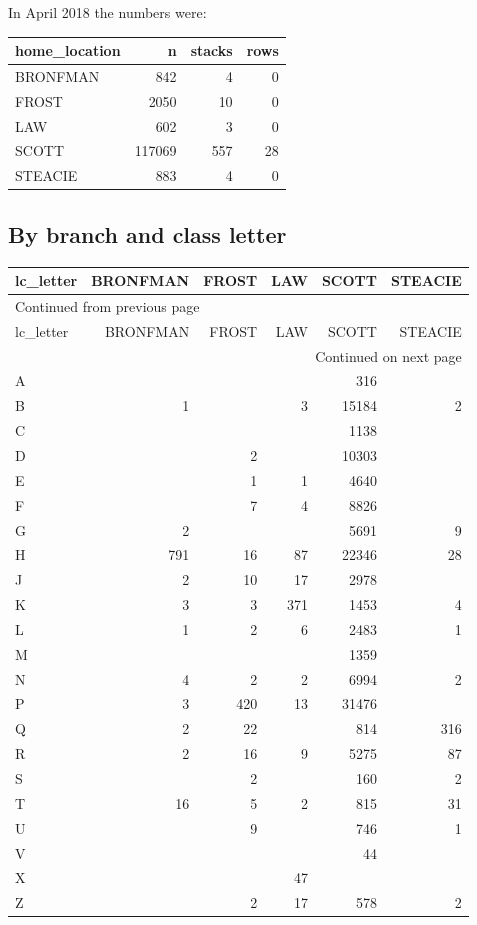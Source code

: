 \documentclass[11pt]{article}
\begin{document}
In April 2018 the numbers were:

\begin{center}
\begin{tabular}{lrrr}
home\_location & n & stacks & rows\\
\hline
BRONFMAN & 842 & 4 & 0\\
FROST & 2050 & 10 & 0\\
LAW & 602 & 3 & 0\\
SCOTT & 117069 & 557 & 28\\
STEACIE & 883 & 4 & 0\\
\end{tabular}
\end{center}

\subsection*{By branch and class letter}
\label{sec:org4b688e9}

\begin{longtable}{lrrrrr}
lc\_letter & BRONFMAN & FROST & LAW & SCOTT & STEACIE\\
\hline
\endfirsthead
\multicolumn{6}{l}{Continued from previous page} \\
\hline

lc\_letter & BRONFMAN & FROST & LAW & SCOTT & STEACIE \\

\hline
\endhead
\hline\multicolumn{6}{r}{Continued on next page} \\
\endfoot
\endlastfoot
\hline
A &  &  &  & 316 & \\
B & 1 &  & 3 & 15184 & 2\\
C &  &  &  & 1138 & \\
D &  & 2 &  & 10303 & \\
E &  & 1 & 1 & 4640 & \\
F &  & 7 & 4 & 8826 & \\
G & 2 &  &  & 5691 & 9\\
H & 791 & 16 & 87 & 22346 & 28\\
J & 2 & 10 & 17 & 2978 & \\
K & 3 & 3 & 371 & 1453 & 4\\
L & 1 & 2 & 6 & 2483 & 1\\
M &  &  &  & 1359 & \\
N & 4 & 2 & 2 & 6994 & 2\\
P & 3 & 420 & 13 & 31476 & \\
Q & 2 & 22 &  & 814 & 316\\
R & 2 & 16 & 9 & 5275 & 87\\
S &  & 2 &  & 160 & 2\\
T & 16 & 5 & 2 & 815 & 31\\
U &  & 9 &  & 746 & 1\\
V &  &  &  & 44 & \\
X &  &  & 47 &  & \\
Z &  & 2 & 17 & 578 & 2\\
\end{longtable}
\end{document}
